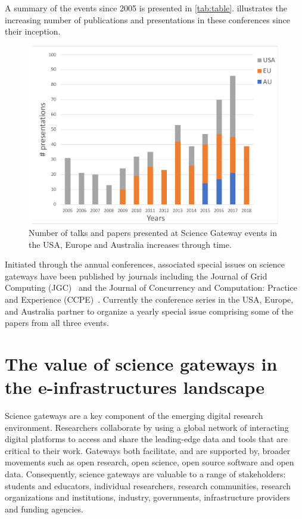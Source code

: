 \documentclass[review]{elsarticle}
\begin{document}
A summary of the events since 2005 is presented in \cref{tab:table}.  illustrates the increasing number of publications and presentations in these conferences since their inception.

\begin{figure}[t]
	\includegraphics[width=0.7\linewidth]{graph}
	\centering
	\caption{Number of talks and papers presented at Science Gateway events in the USA, Europe and Australia increases through time.}
	\label{fig:graph}
\end{figure}


Initiated through the annual conferences, associated special issues on science gateways have been published by journals including the Journal of
Grid Computing (JGC)~\cite{jgc2012,jgc2015-29} and the Journal of Concurrency and Computation: Practice
and Experience (CCPE)~\cite{ccpe2005,ccpe2007,ccpe2011,ccpe2013, ccpe2013-28,ccpe2014-27,ccpe2015}. 
Currently the conference series in the USA, Europe, and Australia partner to organize a yearly special issue comprising some of the papers from all three events.




\section{The value of science gateways in the e-infrastructures landscape}

Science gateways are a key component of the emerging digital research environment. Researchers collaborate by using a global network of interacting digital platforms to access and share the leading-edge data and tools that are critical to their work. Gateways both facilitate, and are supported by, broader movements such as open research, open science, open source software and open data. Consequently, science gateways are valuable to a range of stakeholders: students and educators, individual researchers, research communities, research organizations and institutions, industry, governments, infrastructure providers and funding agencies.
\end{document}
